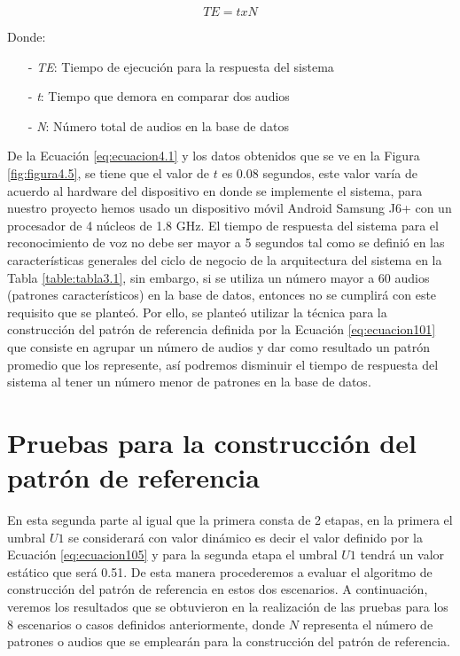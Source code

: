 \begin{equation}
\label{eq:ecuacion4.1}
TE = t x N
\end{equation}

Donde:
\begin{enumerate}
\item[-]\textit{TE}: Tiempo de ejecución para la respuesta del sistema
\item[-]\textit{t}: Tiempo que demora en comparar dos audios
\item[-]\textit{N}: Número total de audios en la base de datos
\end{enumerate}

\vskip 0.5cm
De la Ecuación \eqref{eq:ecuacion4.1} y los datos obtenidos que se ve en la Figura \ref{fig:figura4.5}, se tiene que el valor de $t$ es 0.08 segundos, este valor varía de acuerdo al hardware del dispositivo en donde se implemente el sistema, para nuestro proyecto hemos usado un dispositivo móvil Android Samsung J6+ con un procesador de 4 núcleos de 1.8 GHz.
\vskip 0.5cm
El tiempo de respuesta del sistema para el reconocimiento de voz no debe ser mayor a 5 segundos tal como se definió en las características generales del ciclo de negocio de la arquitectura del sistema en la Tabla \ref{table:tabla3.1}, sin embargo, si se utiliza un número mayor a 60 audios (patrones característicos) en la base de datos, entonces no se cumplirá con este requisito que se planteó.
\vskip 0.5cm
Por ello, se planteó utilizar la técnica para la construcción del patrón de referencia definida por la Ecuación \eqref{eq:ecuacion101} que consiste en agrupar un número de audios y dar como resultado un patrón promedio que los represente, así podremos disminuir el tiempo de respuesta del sistema al tener un número menor de patrones en la base de datos.

\section{Pruebas para la construcción del patrón de referencia}
En esta segunda parte al igual que la primera consta de 2 etapas, en la primera el umbral $U1$ se considerará con valor dinámico es decir el valor definido por la Ecuación \eqref{eq:ecuacion105} y para la segunda etapa el umbral $U1$ tendrá un valor estático que será 0.51. De esta manera procederemos a evaluar el algoritmo de construcción del patrón de referencia en estos dos escenarios.
\vskip 0.5cm
A continuación, veremos los resultados que se obtuvieron en la realización de las pruebas para los 8 escenarios o casos definidos anteriormente, donde $N$ representa el número de patrones o audios que se emplearán para la construcción del patrón de referencia.

